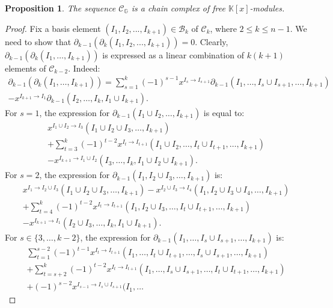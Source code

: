 \documentclass[10pt]{amsart}
\newcommand{\mbk}{\mbox{$\mathbb{K}$}}
\newcommand{\mcb}{\mbox{$\mathcal{B}$}}
\newcommand{\mcc}{\mbox{$\mathcal{C}$}}
\newcommand{\dif}{\mbox{$\partial$}}
\newtheorem{proposition}[cdrthm]{Proposition}
\theoremstyle{definition}
\theoremstyle{remark}
\begin{document}
\begin{proposition}\label{chain-complex}
The sequence $\mcc_{\mathbb{G}}$ is a chain complex of free
$\mbk[x]$-modules.
\end{proposition}
\begin{proof}
Fix a basis element $(I_1,I_2,...,I_{k+1})\in \mcb_k$ of $\mcc_k$,
where $2\leq k\leq n-1$.  We need to show that
$\dif_{k-1}(\dif_{k}(I_{1} ,I_{2},...,I_{k+1}))=0$.  Clearly,
$\dif_{k-1}(\dif_{k}(I_1,\ldots,I_{k+1}))$ is expressed as a linear
combination of $k(k+1)$ elements of $\mcc_{k-2}$. Indeed:
\begin{multline}\label{dd}
\dif_{k-1}(\dif_{k}(I_1,\ldots,I_{k+1}))=   \sum_{s=1}^{k}(-1)^{s-1}x^{I_s\to I_{s+1}}\dif_{k-1}(I_1,\ldots
  ,I_s\cup I_{s+1},\ldots ,I_{k+1}) \\  -x^{I_{k+1}\to
    I_1}\dif_{k-1}(I_2,\ldots,I_{k},I_1\cup I_{k+1}).
\end{multline}
For $s=1$, the expression for $\dif_{k-1}(I_1\cup
I_2,\ldots ,I_{k+1})$ is equal to:
\begin{multline}\label{s=1}
 x^{I_1\cup I_2\to I_3}(I_1\cup I_2\cup I_3,\ldots ,I_{k+1})\\+
  \sum_{t=3}^{k}(-1)^{t-2}x^{I_t\to I_{t+1}}(I_1\cup I_2,\ldots
  ,I_t\cup I_{t+1},\ldots ,I_{k+1}) \\-x^{I_{k+1}\to
    I_{1}\cup I_2}(I_3,\ldots ,I_{k},I_1\cup I_2\cup I_{k+1}). 
\end{multline}
For $s=2$, the expression for $\dif_{k-1}(I_1, I_2\cup I_3,\ldots
,I_{k+1})$ is:
\begin{multline}\label{s=2}
x^{I_1\to I_2\cup I_3}(I_1\cup I_2\cup I_3,\ldots ,I_{k+1}) -x^{I_2\cup I_3\to I_4}(I_1,I_2\cup I_3\cup I_4,\ldots,I_{k+1})  \\ + \sum_{t=4}^{k}(-1)^{t-2}x^{I_t\to I_{t+1}}(I_1,I_2\cup
  I_3,\ldots ,I_t\cup I_{t+1},\ldots ,I_{k+1}) \\
  -x^{I_{k+1}\to I_{1}}(I_2\cup I_3,\ldots ,I_{k},I_1\cup
  I_{k+1}).
\end{multline}
For $s\in\{3,\ldots ,k-2\}$, the expression for $\dif_{k-1}(I_1,\ldots
,I_s\cup I_{s+1},\ldots ,I_{k+1})$ is:
\begin{multline}\label{s=3tok-2}
\sum_{t=1}^{s-2}(-1)^{t-1}x^{I_t\to I_{t+1}}(I_1,\ldots ,I_t\cup
  I_{t+1},\ldots , I_s\cup I_{s+1},\ldots ,I_{k+1})
  \\+\sum_{t=s+2}^{k}(-1)^{t-2}x^{I_t\to I_{t+1}}(I_1,\ldots
  ,I_s\cup I_{s+1},\ldots , I_t\cup I_{t+1},\ldots ,I_{k+1})
  \\+(-1)^{s-2}x^{I_{s-1}\to I_{s}\cup I_{s+1}}(I_1,\ldots

\end{multline}
\end{proof}
\end{document}
